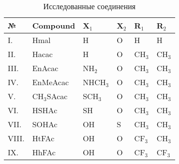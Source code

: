 \printnomenclature[3.5cm] %

\newpage

\begin{figure}[ht]
\label{fig:latex}
\end{figure}

\begin{table} [htbp]%
    \centering
    \caption{Исследованные соединения}%
    \label{tab:comopund_list_1}%
    \renewcommand{\arraystretch}{1.5}%
    \begin{SingleSpace}
        \begin{tabular}{@{}@{\extracolsep{20pt}}llllll@{}} %
            \toprule     %
            №         & Compound        & X$_1$      & X$_2$  & R$_1$      & R$_2$      \\
            \midrule 
            I.        & Hmal            & H          & O      & H          & H          \\
            II.       & Hacac           & H          & O      & CH$_3$     & CH$_3$     \\
            III.      & EnAcac          & NH$_2$     & O      & CH$_3$     & CH$_3$     \\
            IV.       & EnMeAcac        & NHCH$_3$   & O      & CH$_3$     & CH$_3$     \\
            V.        & CH$_3$SAcac     & SCH$_3$    & O      & CH$_3$     & CH$_3$     \\
            VI.       & HSHAc           & SH         & O      & CH$_3$     & CH$_3$     \\
            VII.      & SOHAc           & OH         & S      & CH$_3$     & CH$_3$     \\
            VIII.     & HtFAc           & OH         & O      & CF$_3$     & CH$_3$     \\
            IX.       & HhFAc           & OH         & O      & CF$_3$     & CF$_3$     \\
            \bottomrule 
        \end{tabular}
    \end{SingleSpace}
\end{table}

